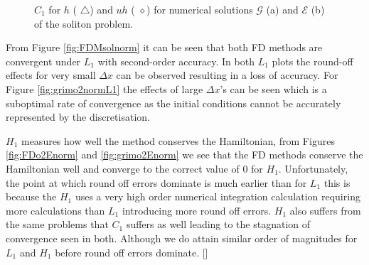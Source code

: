 \documentclass[SingleSpace,12pt,Journal]{Serre_ASCE}
\begin{document}
\begin{figure}
\centering
{}
\caption{$C_1$ for $h$ ({\color{red} $\triangle$}) and $uh$ ({\color{black} $\diamond$}) for numerical solutions $\mathcal{G}$ (a) and $\mathcal{E}$ (b) of the soliton problem.}
\label{fig:FDMsolnormC1}
\end{figure}
%
From Figure \ref{fig:FDMsolnorm} it can be seen that both FD methods are convergent under $L_1$ with second-order accuracy. In both $L_1$ plots the round-off effects for very small $\Delta x$ can be observed resulting in a loss of accuracy. For Figure \ref{fig:grimo2normL1} the effects of large $\Delta x$'s can be seen which is a suboptimal rate of convergence as the initial conditions cannot be accurately represented by the discretisation.

$H_1$ measures how well the method conserves the Hamiltonian, from Figures \ref{fig:FDo2Enorm} and \ref{fig:grimo2Enorm} we see that the FD methods conserve the Hamiltonian well and converge to the correct value of $0$ for $H_1$. Unfortunately, the point at which round off errors dominate is much earlier than for $L_1$ this is because the $H_1$ uses a very high order numerical integration calculation requiring more calculations than $L_1$ introducing more round off errors. $H_1$ also suffers from the same problems that $C
_1$ suffers as well leading to the stagnation of convergence seen in both. Although we do attain similar order of magnitudes for $L_1$ and $H_1$ before round off errors dominate. []
\end{document}
